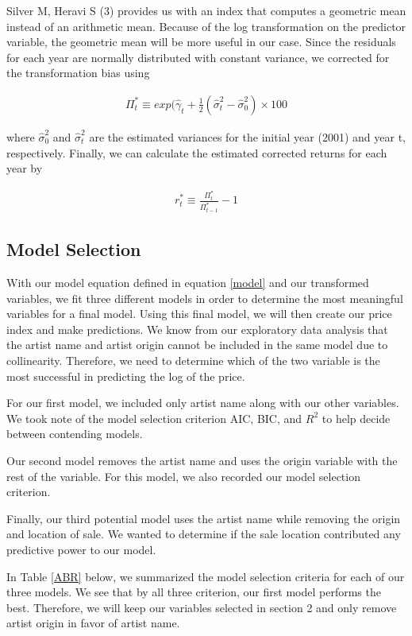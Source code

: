 \documentclass[]{asaproc}\usepackage[]{graphicx}\usepackage[]{color}
\begin{document}
Silver M, Heravi S (3) provides us with an index that computes a geometric mean instead of an arithmetic mean. Because of the log transformation on the predictor variable, the geometric mean will be more useful in our case. Since the residuals for each year are normally distributed with constant variance, we corrected for the transformation bias using

\begin{align}
\Pi^*_t \equiv exp(\hat\gamma_t+\frac{1}{2}(\hat\sigma^2_t - \hat\sigma^2_{0}) \times 100
\label{corr_index}
\end{align}

where $\hat\sigma^2_{0}$ and $\hat\sigma^2_t$ are the estimated variances for the initial year (2001) and year t, respectively. Finally, we can calculate the estimated corrected returns for each year by

\begin{align}
r^*_t \equiv \frac{\Pi^*_t}{\Pi^*_{t-1}}-1 
\label{returns}
\end{align}

\subsection{Model Selection} 

With our model equation defined in equation \ref{model} and our transformed variables, we fit three different models in order to determine the most meaningful variables for a final model. Using this final model, we will then create our price index and make predictions. We know from our exploratory data analysis that the artist name and artist origin cannot be included in the same model due to collinearity. Therefore, we need to determine which of the two variable is the most successful in predicting the log of the price.

For our first model, we included only artist name along with our other variables. We took note of the model selection criterion AIC, BIC, and $R^2$ to help decide between contending models. 

Our second model removes the artist name and uses the origin variable with the rest of the variable. For this model, we also recorded our model selection criterion. 

Finally, our third potential model uses the artist name while removing the origin and location of sale. We wanted to determine if the sale location contributed any predictive power to our model.

In Table \ref{ABR} below, we summarized the model selection criteria for each of our three models. We see that by all three criterion, our first model performs the best. Therefore, we will keep our variables selected in section 2 and only remove artist origin in favor of artist name. 
\end{document}
